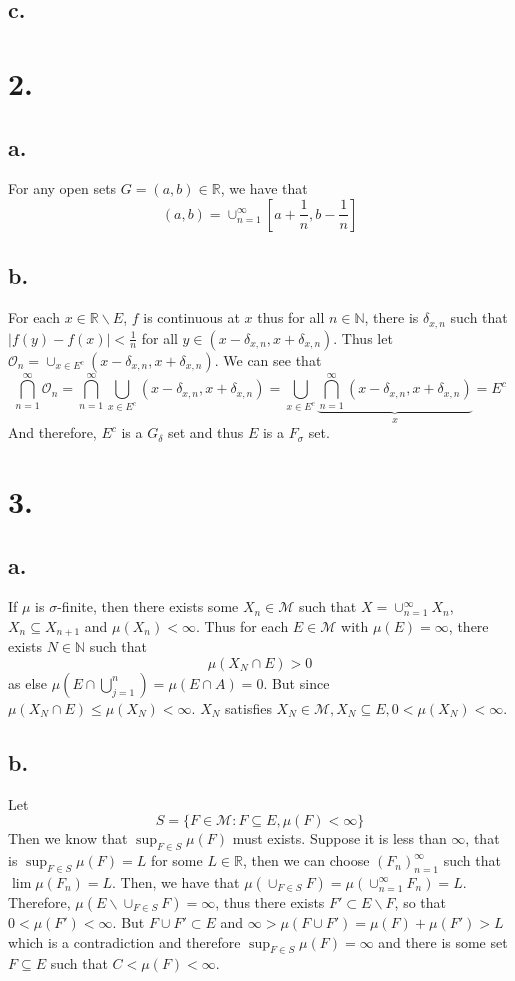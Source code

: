 \documentclass[11pt]{article}
\theoremstyle{mystyle}
\theoremstyle{definition}
\begin{document}
\subsection*{c.}
\newpage
\section*{2.}
\subsection*{a.}
For any open sets $G = (a,b) \in \mathbb{R}$, we have that 
\[
  (a,b) = \cup_{n=1}^\infty \left[a + \displaystyle\frac{1}{n}, b - \displaystyle\frac{1}{n}\right]
\]
\subsection*{b.}
For each $x \in \mathbb{R} \backslash E$, $f$ is continuous at $x$ thus for all $n \in \mathbb{N}$, there is $\delta_{x, n}$ such that $\left| f(y) - f(x)\right| < \displaystyle\frac{1}{n}$ for all $y \in (x-\delta_{x,n}, x+\delta_{x,n})$. Thus let 
$\mathcal{O}_n = \cup_{x \in E^c} (x-\delta_{x,n}, x + \delta_{x,n})$. We can see that 
\[
  \bigcap_{n = 1}^\infty \mathcal{O}_n = \bigcap_{n=1}^\infty \bigcup_{x \in E^c} (x-\delta_{x,n}, x + \delta_{x,n}) = \bigcup_{x \in E^c} \underbrace{\bigcap_{n=1}^\infty (x-\delta_{x,n}, x+\delta_{x,n})}_{x} = E^c 
\]
And therefore, $E^c$ is a $G_\delta$ set and thus $E$ is a $F_\sigma$ set. 
\newpage
\section*{3.}
\subsection*{a.}
If $\mu$ is $\sigma$-finite, then there exists some $X_n \in \mathcal{M}$ such that $X = \cup_{n=1}^\infty X_n$, $X_n \subseteq X_{n+1}$ and $\mu(X_n) < \infty$. Thus for each $E \in \mathcal{M}$ with $\mu(E) = \infty$, there exists $N \in \mathbb{N}$ such that 
\[
  \mu(X_N \cap E)  > 0 
\]
as else 
$\mu(E \cap \bigcup_{j=1}^n) = \mu(E \cap A) = 0$. But since $\mu(X_N \cap E) \le \mu(X_N) < \infty$. $X_N$ satisfies $X_N \in \mathcal{M}, X_N \subseteq E, 0< \mu(X_N)< \infty $. 
\subsection*{b.}
Let 
\[
  S = \{ F \in \mathcal{M}: F \subseteq E, \mu(F) < \infty \}
\]
Then we know that $\sup_{F \in S} \mu(F)$ must exists.  Suppose it is less than $\infty$, that is $\sup_{F \in S} \mu(F) = L$ for some $L \in \mathbb{R}$, then we can choose $(F_n)_{n=1}^\infty$ such that $\lim \mu(F_n) = L$. Then, we have that $\mu(\cup_{F \in S} F) = \mu(\cup_{n =1}^\infty F_n) = L$. Therefore, $\mu(E \backslash \cup_{F \in S}F) = \infty$, thus there exists $F' \subset E \backslash F$, so that $0<\mu(F')<\infty$. But $F \cup F' \subset E$ and $\infty > \mu(F \cup F') = \mu(F) + \mu(F') > L$ which is a contradiction and therefore $\sup_{F \in S}\mu(F)= \infty$ and there is some set $F \subseteq E$ such that $C<\mu(F)< \infty$.  
\end{document}
